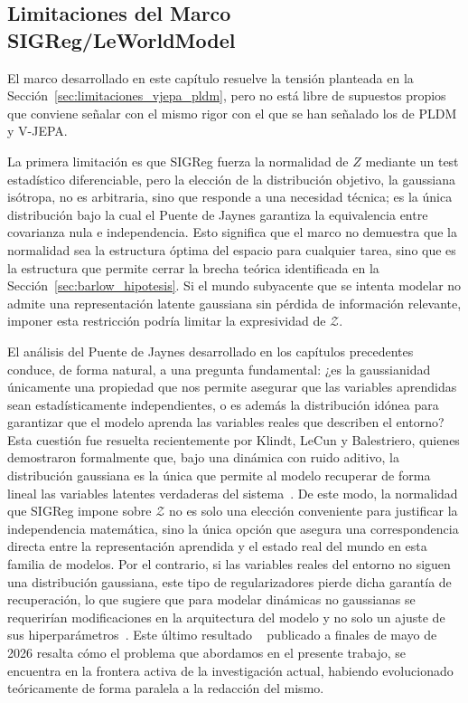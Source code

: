 \subsection{Limitaciones del Marco SIGReg/LeWorldModel}
\label{subsec:limitaciones_sigreg}

El marco desarrollado en este capítulo resuelve la tensión planteada en la Sección~\ref{sec:limitaciones_vjepa_pldm}, pero no está libre de supuestos propios que conviene señalar con el mismo rigor con el que se han señalado los de PLDM y V-JEPA.

La primera limitación es que SIGReg fuerza la normalidad de $Z$ mediante un test estadístico diferenciable, pero la elección de la distribución objetivo, la gaussiana isótropa, no es arbitraria, sino que responde a una necesidad técnica; es la única distribución bajo la cual el Puente de Jaynes garantiza la equivalencia entre covarianza nula e independencia. Esto significa que el marco no demuestra que la normalidad sea la estructura óptima del espacio para cualquier tarea, sino que es la estructura que permite cerrar la brecha teórica identificada en la Sección~\ref{sec:barlow_hipotesis}. Si el mundo subyacente que se intenta modelar no admite una representación latente gaussiana sin pérdida de información relevante, imponer esta restricción podría limitar la expresividad de $\mathcal{Z}$.

El análisis del Puente de Jaynes desarrollado en los capítulos precedentes conduce, de forma natural, a una pregunta fundamental: ¿es la gaussianidad únicamente una propiedad que nos permite asegurar que las variables aprendidas sean estadísticamente independientes, o es además la distribución idónea para garantizar que el modelo aprenda las variables reales que describen el entorno? Esta cuestión fue resuelta recientemente por Klindt, LeCun y Balestriero, quienes demostraron formalmente que, bajo una dinámica con ruido aditivo, la distribución gaussiana es la única que permite al modelo recuperar de forma lineal las variables latentes verdaderas del sistema~\cite{klindt2026lejepa}. De este modo, la normalidad que SIGReg impone sobre $\mathcal{Z}$ no es solo una elección conveniente para justificar la independencia matemática, sino la única opción que asegura una correspondencia directa entre la representación aprendida y el estado real del mundo en esta familia de modelos. Por el contrario, si las variables reales del entorno no siguen una distribución gaussiana, este tipo de regularizadores pierde dicha garantía de recuperación, lo que sugiere que para modelar dinámicas no gaussianas se requerirían modificaciones en la arquitectura del modelo y no solo un ajuste de sus hiperparámetros~\cite{klindt2026lejepa}. Este último resultado ~\cite{klindt2026lejepa} publicado a finales de mayo de 2026 resalta cómo el problema que abordamos en el presente trabajo, se encuentra en la frontera activa de la investigación actual, habiendo evolucionado teóricamente de forma paralela a la redacción del mismo.


